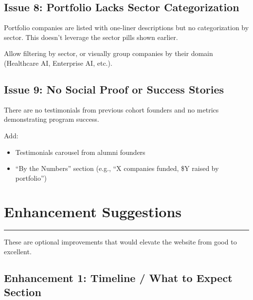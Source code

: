 \documentclass[12pt,a4paper]{article}
\begin{document}
\subsection{Issue 8: Portfolio Lacks Sector Categorization}

\begin{description}[leftmargin=!,labelwidth=\widthof{\bfseries Problem:}]
    \item[Problem:] Portfolio companies are listed with one-liner descriptions but no categorization by sector. This doesn't leverage the sector pills shown earlier.
    
    \item[Recommendation:] Allow filtering by sector, or visually group companies by their domain (Healthcare AI, Enterprise AI, etc.).
\end{description}

\subsection{Issue 9: No Social Proof or Success Stories}

\begin{description}[leftmargin=!,labelwidth=\widthof{\bfseries Problem:}]
    \item[Problem:] There are no testimonials from previous cohort founders and no metrics demonstrating program success.
    
    \item[Recommendation:] Add:
    \begin{itemize}
        \item Testimonials carousel from alumni founders
        \item ``By the Numbers'' section (e.g., ``X companies funded, \$Y raised by portfolio'')
    \end{itemize}
\end{description}

\newpage

\section{Enhancement Suggestions}
\textcolor{enhancementblue}{\rule{\linewidth}{2pt}}

These are optional improvements that would elevate the website from good to excellent.

\subsection{Enhancement 1: Timeline / What to Expect Section}
\end{document}
